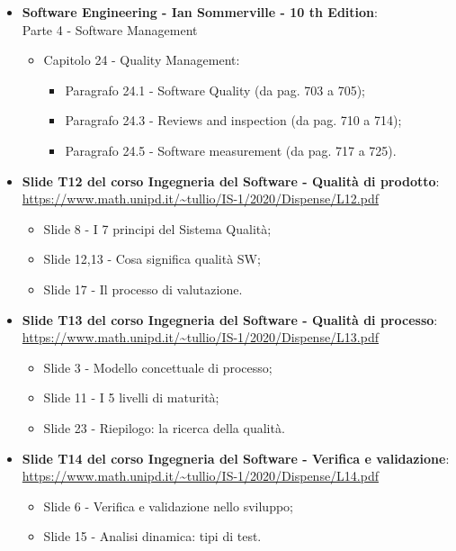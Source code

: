 \begin{itemize}
	\item \textbf{Software Engineering - Ian Sommerville - 10 th Edition}: \\
	Parte 4 - Software Management
	\begin{itemize}
	\item Capitolo 24 - Quality Management:
		\begin{itemize}
			\item Paragrafo 24.1 - Software Quality (da pag. 703 a 705);
			\item Paragrafo 24.3 - Reviews and inspection (da pag. 710 a 714);
			\item Paragrafo 24.5 - Software measurement (da pag. 717 a 725).
		\end{itemize}
	\end{itemize}
	
	\item \textbf{Slide T12 del corso Ingegneria del Software - Qualità di prodotto}:\\
	\textcolor{blue}{\url{https://www.math.unipd.it/~tullio/IS-1/2020/Dispense/L12.pdf}}
	\begin{itemize}
		\item Slide 8 - I 7 principi del Sistema Qualità;
		\item Slide 12,13 - Cosa significa qualità SW;
		\item Slide 17 - Il processo di valutazione.
	\end{itemize}
	
	\item \textbf{Slide T13 del corso Ingegneria del Software - Qualità di processo}:\\
	\textcolor{blue}{\url{https://www.math.unipd.it/~tullio/IS-1/2020/Dispense/L13.pdf}}
		\begin{itemize}
		\item Slide 3 - Modello concettuale di processo;
		\item Slide 11 - I 5 livelli di maturità;
		\item Slide 23 - Riepilogo: la ricerca della qualità.
	\end{itemize}
	
	\item \textbf{Slide T14 del corso Ingegneria del Software - Verifica e validazione}:\\
	\textcolor{blue}{\url{https://www.math.unipd.it/~tullio/IS-1/2020/Dispense/L14.pdf}}
	\begin{itemize}
		\item Slide 6 - Verifica e validazione nello sviluppo; 
		\item Slide 15 - Analisi dinamica: tipi di test.
	\end{itemize}
	

\end{itemize}
